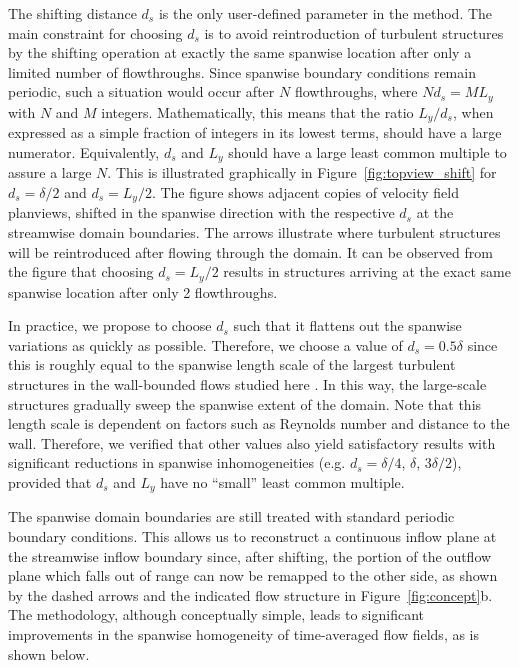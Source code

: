 	The shifting distance $d_s$ is the only user-defined parameter in the method. The main constraint for choosing $d_s$ is to avoid
	reintroduction of turbulent structures by the shifting operation at exactly the same spanwise location after only a limited number of
	flowthroughs. Since spanwise boundary conditions remain periodic, such a situation would occur after $N$ flowthroughs, where $N d_s = M L_y$
	with $N$ and $M$ integers. Mathematically, this means that the ratio $L_y/d_s$, when expressed as a simple fraction of integers in its lowest
	terms, should have a large numerator. Equivalently, $d_s$ and $L_y$ should have a large least common multiple to assure a large $N$. This is
	illustrated graphically in Figure~\ref{fig:topview_shift} for $d_s = \delta/2$ and $d_s = L_y/2$. The figure shows adjacent copies of velocity field planviews, shifted in the spanwise direction with the respective $d_s$ at the streamwise domain boundaries. The arrows illustrate where turbulent structures will be reintroduced after flowing through the domain. It can be observed from the figure that choosing $d_s = L_y/2$ results in structures arriving at the exact same spanwise location after only 2 flowthroughs.
	
	In practice, we propose to choose $d_s$ such that it flattens out the spanwise variations as quickly as possible. 
	Therefore, we choose a value of $d_s = 0.5\delta$ since this is roughly equal to the spanwise length scale of the largest turbulent structures in the wall-bounded flows studied here \citep{tomkins2003spanwise, hutchins2007evidence,fang2015large}. 
	In this way, the large-scale structures gradually sweep the spanwise extent of the domain. 
	Note that this length scale is dependent on factors such as Reynolds number and distance to the wall. 
	Therefore, we verified that other values also yield satisfactory results with significant reductions in spanwise inhomogeneities (e.g. $d_s = \delta/4$, $\delta$, $3\delta/2$), provided that $d_s$ and $L_y$ have no ``small'' least common multiple.
	
	The spanwise domain boundaries are still treated with standard periodic boundary conditions. This allows us to reconstruct a continuous inflow plane at the streamwise inflow boundary since, after shifting, the portion of the outflow plane which falls out of range can now be remapped to the other side, as shown by the dashed arrows and the indicated flow structure in Figure~\ref{fig:concept}b. The methodology, although conceptually simple, leads to significant improvements in the spanwise homogeneity of time-averaged flow fields, as is shown below.
	

